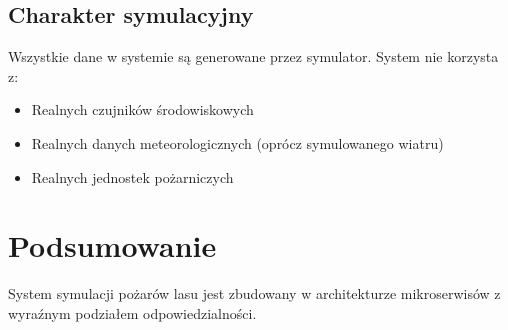 \subsection{Charakter symulacyjny}

Wszystkie dane w systemie są generowane przez symulator. System nie korzysta z:
\begin{itemize}
    \item Realnych czujników środowiskowych
    \item Realnych danych meteorologicznych (oprócz symulowanego wiatru)
    \item Realnych jednostek pożarniczych
\end{itemize}

\section{Podsumowanie}

System symulacji pożarów lasu jest zbudowany w architekturze mikroserwisów z wyraźnym podziałem odpowiedzialności. 

